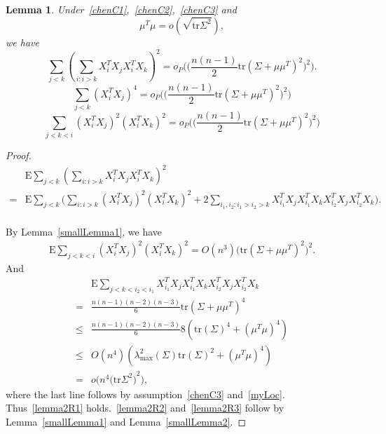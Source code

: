 \documentclass[review]{elsarticle}
\theoremstyle{plain}
\newtheorem{lemma}{Lemma}
\theoremstyle{definition}
\theoremstyle{remark}
\begin{document}
\begin{lemma}
    Under~\eqref{chenC1},~\eqref{chenC2},~\eqref{chenC3} and 
    \begin{equation}\label{myLoc}
        \mu^T \mu=o(\sqrt{\mathrm{tr}\Sigma^2}),
    \end{equation}
we have
    \begin{equation}\label{lemma2R1}
        \sum_{j<k}{(\sum_{i:i>k}X_i^T X_j X_i^T X_k)}^2
        =o_P\Big(\big(\frac{n(n-1)}{2}\mathrm{tr}(\Sigma+\mu\mu^T)^2\big)^2\Big).
    \end{equation}
    \begin{equation}\label{lemma2R2}
        \sum_{j<k}{(X_i^T X_j)}^4=o_P\Big(\big(\frac{n(n-1)}{2}\mathrm{tr}(\Sigma+\mu\mu^T)^2\big)^2\Big)
    \end{equation}
    \begin{equation}\label{lemma2R3}
        \sum_{j<k<i}{(X_i^T X_j)}^2{(X_i^T X_k)}^2 =o_P\Big(\big(\frac{n(n-1)}{2}\mathrm{tr}(\Sigma+\mu\mu^T)^2\big)^2\Big)
    \end{equation}
\end{lemma}
\begin{proof}
    \begin{equation*}
    \begin{aligned}
        &\mathrm{E}\sum_{j<k}{(\sum_{i:i>k}X_i^T X_j X_i^T X_k)}^2\\
        =&
        \mathrm{E}\sum_{j<k}\Big(\sum_{i:i>k}(X_i^T X_j)^2 (X_i^T X_k)^2+2\sum_{i_1,i_2:i_1>i_2>k}X_{i_1}^T X_j X_{i_1}^T X_k X_{i_2}^T X_j X_{i_2}^T X_k\Big).\\
    \end{aligned}
    \end{equation*}

    By Lemma~\ref{smallLemma1}, we have
    \begin{equation*}
    \begin{aligned}
        \mathrm{E}\sum_{j<k<i}(X_i^T X_j)^2 (X_i^T X_k)^2    =O(n^3)\big(\mathrm{tr}(\Sigma+\mu\mu^T)^2\big)^2.
    \end{aligned}
    \end{equation*}
And
    \begin{equation*}
    \begin{aligned}
        &\mathrm{E}\sum_{j<k<i_2<i_1}X_{i_1}^T X_j X_{i_1}^T X_k X_{i_2}^T X_j X_{i_2}^T X_k\\
        =&\frac{n(n-1)(n-2)(n-3)}{6}\mathrm{tr}{(\Sigma+\mu\mu^T)}^4\\
        \leq& \frac{n(n-1)(n-2)(n-3)}{6}8(\mathrm{tr}{(\Sigma)}^4+(\mu^T \mu)^4)\\
        \leq& O(n^4)(\lambda_{\max}^2(\Sigma)\mathrm{tr}{(\Sigma)}^2+(\mu^T \mu)^4)\\
        =&
        o\Big(n^4{\big(\mathrm{tr}\Sigma^2\big)}^2\Big),
    \end{aligned}
    \end{equation*}
    where the last line follows by assumption~\eqref{chenC3} and~\eqref{myLoc}.
    Thus~\eqref{lemma2R1} holds.~\eqref{lemma2R2} and~\eqref{lemma2R3} follow by Lemma~\ref{smallLemma1} and Lemma~\ref{smallLemma2}.

\end{proof}
\end{document}
